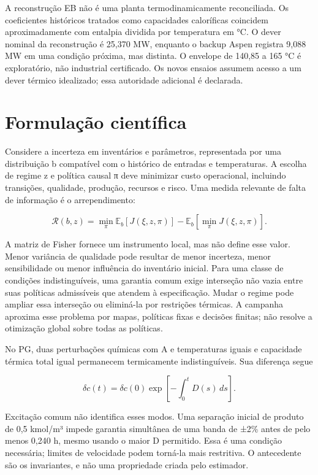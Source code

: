 \documentclass[
  11pt,
  letterpaper,
]{article}
\begin{document}
A reconstrução EB não é uma planta termodinamicamente reconciliada. Os
coeficientes históricos tratados como capacidades caloríficas coincidem
aproximadamente com entalpia dividida por temperatura em °C. O dever
nominal da reconstrução é 25,370 MW, enquanto o backup Aspen registra
9,088 MW em uma condição próxima, mas distinta. O envelope de 140,85 a
165 °C é exploratório, não industrial certificado. Os novos ensaios
assumem acesso a um dever térmico idealizado; essa autoridade adicional
é declarada.

\hypertarget{formulauxe7uxe3o-cientuxedfica}{%
\section{Formulação científica}\label{formulauxe7uxe3o-cientuxedfica}}

Considere a incerteza em inventários e parâmetros, representada por uma
distribuição b compatível com o histórico de entradas e temperaturas. A
escolha de regime z e política causal π deve minimizar custo
operacional, incluindo transições, qualidade, produção, recursos e
risco. Uma medida relevante de falta de informação é o arrependimento:

\[
\mathcal R(b,z)=\min_\pi {\mathbb E}_b[J(\xi,z,\pi)]
-{\mathbb E}_b[\min_\pi J(\xi,z,\pi)].
\]

A matriz de Fisher fornece um instrumento local, mas não define esse
valor. Menor variância de qualidade pode resultar de menor incerteza,
menor sensibilidade ou menor influência do inventário inicial. Para uma
classe de condições indistinguíveis, uma garantia comum exige interseção
não vazia entre suas políticas admissíveis que atendem à especificação.
Mudar o regime pode ampliar essa interseção ou eliminá-la por restrições
térmicas. A campanha aproxima esse problema por mapas, políticas fixas e
decisões finitas; não resolve a otimização global sobre todas as
políticas.

No PG, duas perturbações químicas com A e temperaturas iguais e
capacidade térmica total igual permanecem termicamente indistinguíveis.
Sua diferença segue

\[
\delta c(t)=\delta c(0)\exp\left[-\int_0^t D(s)\,ds\right].
\]

Excitação comum não identifica esses modos. Uma separação inicial de
produto de 0,5 kmol/m³ impede garantia simultânea de uma banda de ±2\%
antes de pelo menos 0,240 h, mesmo usando o maior D permitido. Essa é
uma condição necessária; limites de velocidade podem torná-la mais
restritiva. O antecedente são os invariantes, e não uma propriedade
criada pelo estimador.
\end{document}
